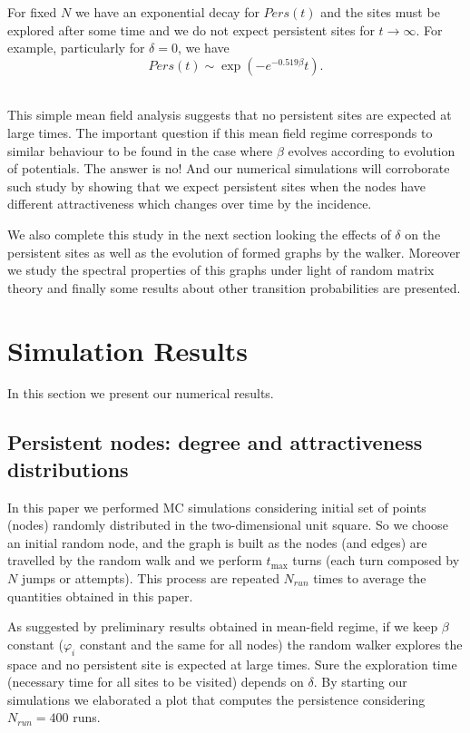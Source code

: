 \documentclass[3p, 11pt]{elsarticle}
\begin{document}
For fixed $N$ we have an exponential decay for $Pers(t)$ and the sites must
be explored after some time and we do not expect persistent sites for $%
t\rightarrow \infty $. For example, particularly for $\delta =0$, we have 
\begin{equation*}
Pers(t)\sim \exp (-e^{-0.519\beta }t)\text{.}
\end{equation*}%
\ 

This simple mean field analysis suggests that no persistent sites are
expected at large times. The important question if this mean field regime
corresponds to similar behaviour to be found in the case where $\beta $
evolves according to evolution of potentials. The answer is no! And our
numerical simulations will corroborate such study by showing that we expect
persistent sites when the nodes have different attractiveness which changes
over time by the incidence.

We also complete this study in the next section looking the effects of $%
\delta $ on the persistent sites as well as the evolution of formed graphs
by the walker. Moreover we study the spectral properties of this graphs
under light of random matrix theory and finally some results about other
transition probabilities are presented.

\section{Simulation Results  }

\label{Sec:Simulational_results}

In this section we present our numerical results.  

\subsection{Persistent nodes: degree and attractiveness distributions}

In this paper we performed MC simulations considering initial set of points
(nodes) randomly distributed in the two-dimensional unit square. So we
choose an initial random node, and the graph is built as the nodes (and
edges) are travelled by the random walk and we perform $t_{\max }$ turns
(each turn composed by $N$ jumps or attempts). This process are repeated $%
N_{run}$ times to average the quantities obtained in this paper.

As suggested by preliminary results obtained in mean-field regime, if we
keep $\beta $ constant ($\varphi _{i}$ constant and the same for all nodes)
the random walker explores the space and no persistent site is expected at
large times. Sure the exploration time (necessary time for all sites to be
visited) depends on $\delta $. By starting our simulations we elaborated a
plot that computes the persistence considering $N_{run}=400$ runs.
\end{document}
